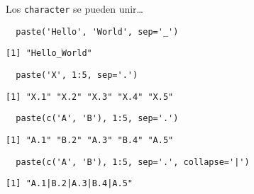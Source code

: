 \documentclass[xcolor={usenames,svgnames,dvipsnames}]{beamer}
\begin{document}
\begin{frame}[fragile,label={sec:org329f850}]{Los \texttt{character} se pueden unir\ldots{}}
 \lstset{language=r,label= ,caption= ,captionpos=b,numbers=none}
\begin{lstlisting}
  paste('Hello', 'World', sep='_')
\end{lstlisting}

\begin{verbatim}
[1] "Hello_World"
\end{verbatim}

\lstset{language=r,label= ,caption= ,captionpos=b,numbers=none}
\begin{lstlisting}
  paste('X', 1:5, sep='.')
\end{lstlisting}

\begin{verbatim}
[1] "X.1" "X.2" "X.3" "X.4" "X.5"
\end{verbatim}

\lstset{language=r,label= ,caption= ,captionpos=b,numbers=none}
\begin{lstlisting}
  paste(c('A', 'B'), 1:5, sep='.')
\end{lstlisting}

\begin{verbatim}
[1] "A.1" "B.2" "A.3" "B.4" "A.5"
\end{verbatim}

\lstset{language=r,label= ,caption= ,captionpos=b,numbers=none}
\begin{lstlisting}
  paste(c('A', 'B'), 1:5, sep='.', collapse='|')
\end{lstlisting}

\begin{verbatim}
[1] "A.1|B.2|A.3|B.4|A.5"
\end{verbatim}
\end{frame}
\end{document}
